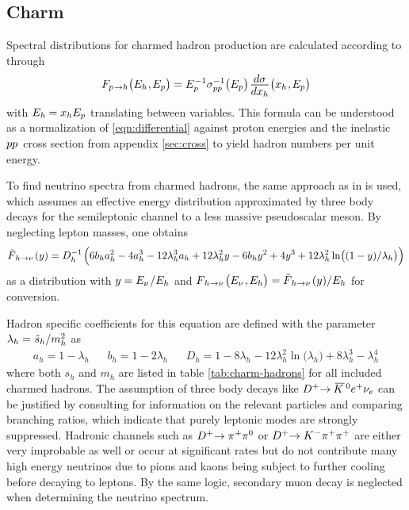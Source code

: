 \subsection*{Charm}

Spectral distributions for charmed hadron production are calculated according to \cite{Carpio_2020} through
\begin{equation*}
	F_{p \kern+0.8pt \rightarrow h} \bigl( E_h \kern+0.5pt , \kern-0.5pt E_p \bigr) =
	E_p^{\kern+0.5pt -1} \sigma_{p \kern-0.1pt p}^{-1} \bigl( E_p \bigr) \kern+1.0pt
	\frac{\raisebox{-0.5ex}{$d\sigma$}}{\raisebox{0.5ex}{$dx_h$}} \bigl( x_h \kern+0.5pt, \kern-0.5pt E_p \bigr)
\end{equation*}
with $E_h \kern-0.2pt = x_h E_p$ translating between variables. This formula can be understood as a normalization of
\eqref{eqn:differential} against proton energies and the inelastic $p \kern-0.1pt p \kern+0.9pt$ cross section from appendix
\ref{sec:cross} to yield hadron numbers per unit energy.

To find neutrino spectra from charmed hadrons, the same approach as in \cite{Carpio_2020} is used, which assumes an effective
energy distribution approximated by three body decays for the semileptonic channel to a less massive pseudoscalar meson.
By neglecting lepton masses, one obtains
\begin{equation*}
	\tilde{F}_{\kern+1.0pt h \kern+0.2pt \rightarrow \nu \kern+1.0pt} (y) = D_h^{-1} \kern+1.0pt \Bigl( 6b_ha_h^2 - 4a_h^3
	- 12\lambda_h^3 a_h + 12\lambda_h^2 y - 6b_h y^2 + 4 y^3 + 12 \lambda_h^2 \ln \bigl((1 - y) / \lambda_h \bigr) \Bigr)
\end{equation*}
as a distribution with $y = E_\nu \kern+0.6pt / E_h$ and $F_{\kern+1.0pt h \kern+0.2pt \rightarrow \nu \kern+1.0pt}
\bigl( E_\nu \kern+1.0pt , \kern-0.5pt E_h \bigr) = \tilde{F}_{\kern+1.0pt h \kern+0.2pt \rightarrow \nu \kern+1.0pt}
(y) / E_h$ for conversion.

Hadron specific coefficients for this equation are defined with the parameter
$\lambda_h = \kern+0.5pt \tilde{s}_h / m_h^2 \kern+0.2pt$ as
\begin{align*}
	a_h = 1 - \lambda_h && b_h = 1 - 2\lambda_h &&
	D_h = 1 - 8 \lambda_h - 12\lambda_h^2 \ln \bigl( \lambda_h \bigr) + 8 \lambda_h^3 - \lambda_h^4
\end{align*}
where both $s_h$ and $m_h$ are listed in table \ref{tab:charm-hadrons} for all included charmed hadrons. The assumption of three
body decays like $D^+ \kern-2.5pt \rightarrow \kern+1.0pt \overline{\kern-1.5pt K \kern+1.0pt}\kern+1.0pt^0 e^+ \nu_e$ can
be justified by consulting \cite{pdg} for information on the relevant particles and comparing branching ratios, which indicate
that purely leptonic modes are strongly suppressed. Hadronic channels such as $D^+ \kern-2.5pt \rightarrow \pi^+ \pi^0$ or
$D^+ \kern-2.5pt \rightarrow K^{\kern+0.5pt -} \pi^+ \pi^+$ are either very improbable as well or occur at significant rates but
do not contribute many high energy neutrinos due to pions and kaons being subject to further cooling before decaying to leptons.
By the same logic, secondary muon decay is neglected when determining the neutrino spectrum.

